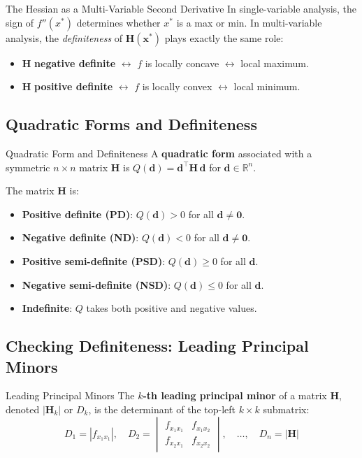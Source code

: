 \documentclass[12pt, a4paper]{article}
\theoremstyle{definition}
\newcommand{\R}{\mathbb{R}}
\newcommand{\bx}{\mathbf{x}}
\newcommand{\bz}{\mathbf{0}}
\newcommand{\bH}{\mathbf{H}}
\begin{document}
\begin{keybox}{The Hessian as a Multi-Variable Second Derivative}
In single-variable analysis, the sign of $f''(x^*)$ determines whether
$x^*$ is a max or min. In multi-variable analysis, the \emph{definiteness}
of $\bH(\bx^*)$ plays exactly the same role:
\begin{itemize}
  \item $\bH$ \textbf{negative definite} $\leftrightarrow$ $f$ is locally
        concave $\leftrightarrow$ local maximum.
  \item $\bH$ \textbf{positive definite} $\leftrightarrow$ $f$ is locally
        convex $\leftrightarrow$ local minimum.
\end{itemize}
\end{keybox}

\subsection{Quadratic Forms and Definiteness}

\begin{defbox}{Quadratic Form and Definiteness}
A \textbf{quadratic form} associated with a symmetric $n \times n$ matrix
$\bH$ is $Q(\mathbf{d}) = \mathbf{d}^\top \bH\, \mathbf{d}$ for
$\mathbf{d} \in \R^n$.

The matrix $\bH$ is:
\begin{itemize}
  \item \textbf{Positive definite (PD)}: $Q(\mathbf{d}) > 0$ for all
        $\mathbf{d} \neq \bz$.
  \item \textbf{Negative definite (ND)}: $Q(\mathbf{d}) < 0$ for all
        $\mathbf{d} \neq \bz$.
  \item \textbf{Positive semi-definite (PSD)}: $Q(\mathbf{d}) \geq 0$ for
        all $\mathbf{d}$.
  \item \textbf{Negative semi-definite (NSD)}: $Q(\mathbf{d}) \leq 0$ for
        all $\mathbf{d}$.
  \item \textbf{Indefinite}: $Q$ takes both positive and negative values.
\end{itemize}
\end{defbox}

\subsection{Checking Definiteness: Leading Principal Minors}

\begin{defbox}{Leading Principal Minors}
The \textbf{$k$-th leading principal minor} of a matrix $\bH$, denoted
$|\bH_k|$ or $D_k$, is the determinant of the top-left $k \times k$
submatrix:
\[
  D_1 = |f_{x_1 x_1}|, \quad
  D_2 = \begin{vmatrix} f_{x_1 x_1} & f_{x_1 x_2} \\ f_{x_2 x_1} & f_{x_2 x_2} \end{vmatrix}, \quad
  \ldots, \quad
  D_n = |\bH|
\]
\end{defbox}
\end{document}
